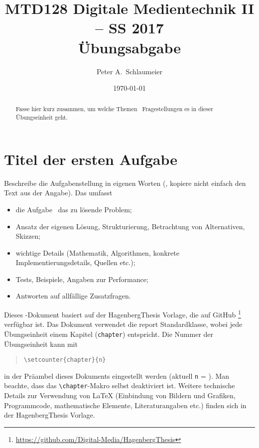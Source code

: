 \documentclass[a4paper,onecolumn,notitlepage,ngerman,11pt]{report}
\author{Peter A.\ Schlaumeier}
\title{MTD128 Digitale Medientechnik II -- SS 2017\\
				Übungsabgabe \arabic{chapter}}
\date{\today}
\renewcommand{\chapter}[1]{}	%
\begin{document}
\maketitle

\begin{abstract}\noindent
Fasse hier kurz zusammen, um welche Themen \bzw\ Fragestellungen 
es in dieser Übungseinheit geht.
\end{abstract}


\section{Titel der ersten Aufgabe}

Beschreibe die Aufgabenstellung in eigenen Worten 
(\dah, kopiere nicht einfach den Text aus der Angabe).
Das umfasst \ia 
\begin{itemize}
\item
	die Aufgabe \bzw\ das zu lösende Problem;
\item
	Ansatz der eigenen Lösung, Strukturierung, Betrachtung von Alternativen, Skizzen;
\item
	wichtige Details (Mathematik, Algorithmen, konkrete Implementierungsdetails,
	Quellen \cite{Sedgewick2011} %
	etc.);
\item
	Tests, Beispiele, Angaben zur Performance;
\item
	Antworten auf allfällige Zusatzfragen.
\end{itemize}
%
Dieses \latex-Dokument basiert auf der \textsf{HagenbergThesis} 
Vorlage, die auf GitHub%
\footnote{\url{https://github.com/Digital-Media/HagenbergThesis}}
verfügbar ist.
Das Dokument verwendet die \textsf{report} Standardklasse,
wobei jede Übungseinheit einem Kapitel (\texttt{chapter}) entspricht.
Die Nummer der Übungseinheit kann mit
\begin{quote}
\verb!\setcounter{chapter}{n}!
\end{quote}
in der Präambel dieses Dokuments eingestellt werden (aktuell \texttt{n} = ).
Man beachte, dass das \verb!\chapter!-Makro selbst deaktiviert ist.
Weitere technische Details zur Verwendung von LaTeX (Einbindung von Bildern und Grafiken,
Programmcode, mathematische Elemente, 
Literaturangaben etc.) finden sich in der \textsf{HagenbergThesis} Vorlage.
\end{document}
